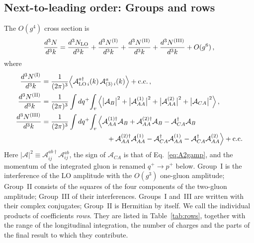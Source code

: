 \subsection{Next-to-leading order: Groups and rows}\label{sec:groups}

The $O(g^4)$ cross section is
\begin{align}\label{eq:NLOdecomp}
\frac{d^3N}{d^3k}=\frac{d^3N_{\rm LO}}{d^3k}+\frac{d^3N^{\rm(I)}}{d^3k}+\frac{d^3N^{\rm(II)}}{d^3k}+\frac{d^3N^{\rm(III)}}{d^3k}+O(g^6)\,,
\end{align}
where
\begin{align}\label{eq:Groups}
\frac{d^3N^{\rm(I)}}{d^3k}&=\frac{1}{(2\pi)^3}\Big\langle\mathcal A^{a\dagger}_{{\rm LO}\,i}(k)\,\mathcal A^a_{(3)\,i}(k)\Big\rangle+{\rm c.c.}\,,\notag\\
\frac{d^3N^{\rm(II)}}{d^3k}&=\frac{1}{(2\pi)^3}\int dq^+\!\int_v\Big\langle\big|\mathcal A_B\big|^2+\big|\mathcal A^{(1)}_{AA}\big|^2+\big|\mathcal A^{(2)}_{AA}\big|^2+\big|\mathcal A_{CA}\big|^2\Big\rangle\,,\notag\\
\frac{d^3N^{\rm(III)}}{d^3k}&=\frac{1}{(2\pi)^3}\int dq^+\!\int_v\Big\langle\mathcal A^{(1)\dagger}_{AA}\mathcal A_B+\mathcal A^{(2)\dagger}_{AA}\mathcal A_B-\mathcal A^{\dagger}_{CA}\mathcal A_B
\notag\\&\hspace{3.3cm}+\mathcal A^{(2)\dagger}_{AA}\mathcal A^{(1)}_{AA}-\mathcal A^{\dagger}_{CA}\mathcal A^{(1)}_{AA}-\mathcal A^{\dagger}_{CA}\mathcal A^{(2)}_{AA}\Big\rangle+{\rm c.c.}
\end{align}
Here $|\mathcal A|^2\equiv\mathcal A^{ab\dagger}_{ij}\mathcal A^{ab}_{ij}$, the sign of $\mathcal A_{CA}$ is that of Eq.~\eqref{eq:A2gamp}, and the momentum of the integrated gluon is renamed $q^+\to p^+$ below. Group~I is the interference of the LO amplitude with the $O(g^3)$ one-gluon amplitude; Group~II consists of the squares of the four components of the two-gluon amplitude; Group~III of their interferences. Groups~I and~III are written with their complex conjugates; Group~II is Hermitian by itself. We call the individual products of coefficients \emph{rows}. They are listed in Table~\ref{tab:rows}, together with the range of the longitudinal integration, the number of charges and the parts of the final result to which they contribute.

